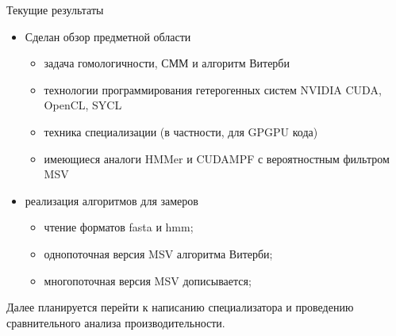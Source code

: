 \documentclass[hyperref={pdfpagelabels=false}]{beamer}
\begin{document}
\begin{frame}{Текущие результаты}
\begin{itemize}
	\item Сделан обзор предметной области
	\begin{itemize}	
		\item задача гомологичности, СММ и алгоритм Витерби
		\item технологии программирования гетерогенных систем NVIDIA CUDA, 		
			OpenCL, SYCL
		\item техника специализации (в частности, для GPGPU кода)
		\item имеющиеся аналоги HMMer и CUDAMPF с вероятностным фильтром MSV
	\end{itemize}
	\vfill
	\item реализация алгоритмов для замеров
		\begin{itemize}
			\item чтение форматов fasta и hmm;
			\item однопоточная версия MSV алгоритма Витерби;
			\item многопоточная версия MSV дописывается;
		\end{itemize}
\end{itemize}
\vfill
Далее планируется перейти к написанию специализатора и проведению 
сравнительного анализа производительности.
\end{frame} 
\end{document}
